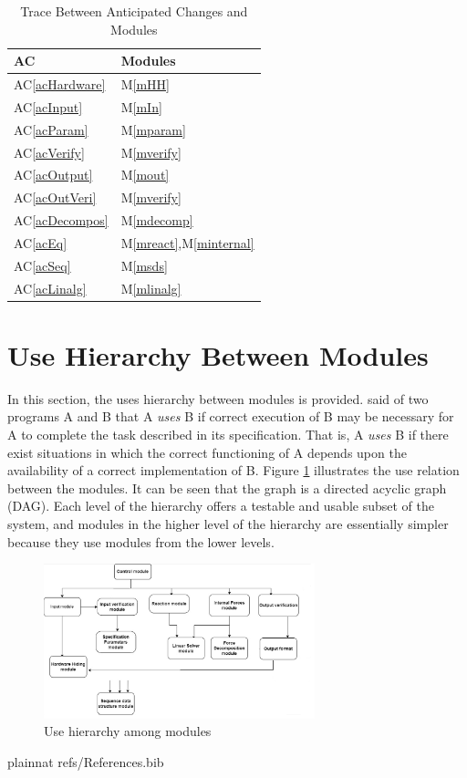 \documentclass[12pt, titlepage]{article}
\newcommand{\acref}[1]{AC\ref{#1}}
\newcommand{\mref}[1]{M\ref{#1}}
\begin{document}
\begin{table}[H]
\centering
\begin{tabular}{p{} p{}}
\toprule
\textbf{AC} & \textbf{Modules}\\
\midrule
\acref{acHardware} & \mref{mHH}\\
\acref{acInput} & \mref{mIn}\\
\acref{acParam} & \mref{mparam}\\
\acref{acVerify} & \mref{mverify}\\
\acref{acOutput} & \mref{mout}\\
\acref{acOutVeri} & \mref{mverify}\\
\acref{acDecompos} & \mref{mdecomp}\\
\acref{acEq} & \mref{mreact},\mref{minternal}\\
\acref{acSeq} & \mref{msds}\\
\acref{acLinalg} & \mref{mlinalg}\\
\bottomrule
\end{tabular}
\caption{Trace Between Anticipated Changes and Modules}
\label{TblACT}
\end{table}

\section{Use Hierarchy Between Modules} \label{SecUse}

In this section, the uses hierarchy between modules is
provided. \citet{Parnas1978} said of two programs A and B that A {\em uses} B if
correct execution of B may be necessary for A to complete the task described in
its specification. That is, A {\em uses} B if there exist situations in which
the correct functioning of A depends upon the availability of a correct
implementation of B.  Figure \ref{FigUH} illustrates the use relation between
the modules. It can be seen that the graph is a directed acyclic graph
(DAG). Each level of the hierarchy offers a testable and usable subset of the
system, and modules in the higher level of the hierarchy are essentially simpler
because they use modules from the lower levels.

\begin{figure}[H]
\centering
\includegraphics[width=0.7\textwidth]{mg.png}
\caption{Use hierarchy among modules}
\label{FigUH}
\end{figure}


 {plainnat}
 {refs/References.bib}

\newpage{}
\end{document}
